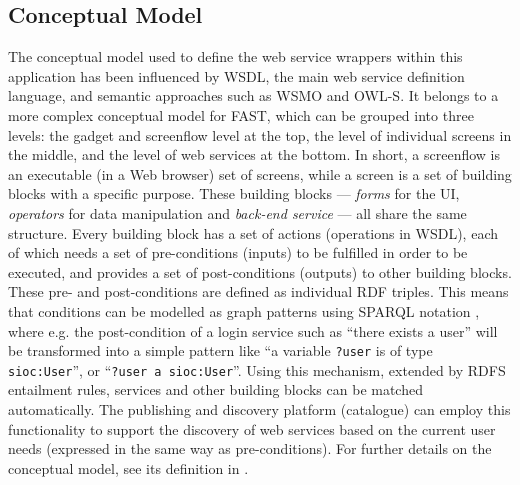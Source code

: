 
\subsection{Conceptual Model}
\label{ssec:ontology}
The conceptual model used to define the web service wrappers within this application has been influenced by WSDL, the main web service definition language, and semantic approaches such as WSMO and OWL-S. It belongs to a more complex conceptual model for FAST, which can be grouped into three levels: the gadget and screenflow level at the top, the level of individual screens in the middle, and the level of web services at the bottom. 
In short, a screenflow is an executable (in a Web browser) set of screens, while a screen is a set of building blocks with a specific purpose. These building blocks --- \emph{forms} for the UI, \emph{operators} for data manipulation and \emph{back-end service} --- all share the same structure. Every building block has a set of actions (operations in WSDL), each of which needs a set of pre-conditions (inputs) to be fulfilled in order to be executed, and provides a set of post-conditions (outputs) to other building blocks. These pre- and post-conditions are defined as individual RDF triples. This means that conditions can be modelled as graph patterns using SPARQL notation \cite{sparql2008spec}, where e.g. the post-condition of a login service such as ``there exists a user'' will be transformed into a simple pattern like ``a variable \texttt{?user} is of type \texttt{sioc:User}'', or ``\texttt{?user a sioc:User}''. Using this mechanism, extended by RDFS entailment rules, services and other building blocks can be matched automatically. The publishing and discovery platform (catalogue) can employ this functionality to support the discovery of web services based on the current user needs (expressed in the same way as pre-conditions). For further details on the conceptual model, see its definition in \cite{moeller2010fast_ontology}.

